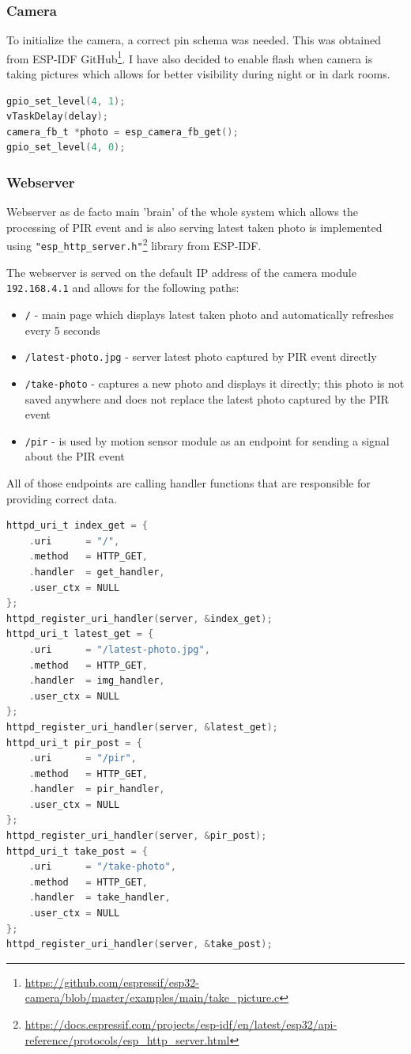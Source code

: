 \documentclass{article}
\begin{document}
    \subsubsection{Camera}
    To initialize the camera, a correct pin schema was needed. This was obtained from ESP-IDF GitHub\footnote{\url{https://github.com/espressif/esp32-camera/blob/master/examples/main/take_picture.c}}.
    I have also decided to enable flash when camera is taking pictures which allows for better visibility
    during night or in dark rooms.
    \begin{lstlisting}[language=C]
gpio_set_level(4, 1);
vTaskDelay(delay);
camera_fb_t *photo = esp_camera_fb_get();
gpio_set_level(4, 0);
    \end{lstlisting}
    
    \subsubsection{Webserver}
    Webserver as de facto main 'brain' of the whole system which allows the processing of PIR event and is also
    serving latest taken photo is implemented using \verb|"esp_http_server.h"|\footnote{\url{https://docs.espressif.com/projects/esp-idf/en/latest/esp32/api-reference/protocols/esp_http_server.html}} library from ESP-IDF.
    
    The webserver is served on the default IP address of the camera module \verb|192.168.4.1| and allows for the following paths:
    \begin{itemize}
        \item \verb|/| - main page which displays latest taken photo and automatically refreshes every 5 seconds
        \item \verb|/latest-photo.jpg| - server latest photo captured by PIR event directly
        \item \verb|/take-photo| - captures a new photo and displays it directly; this photo is not saved anywhere and does not replace
        the latest photo captured by the PIR event
        \item \verb|/pir| - is used by motion sensor module as an endpoint for sending a signal about the PIR event
    \end{itemize}
    
    All of those endpoints are calling handler functions that are responsible for providing correct data.
    \begin{lstlisting}[language=C]
httpd_uri_t index_get = {
    .uri      = "/",
    .method   = HTTP_GET,
    .handler  = get_handler,
    .user_ctx = NULL
};
httpd_register_uri_handler(server, &index_get);
httpd_uri_t latest_get = {
    .uri      = "/latest-photo.jpg",
    .method   = HTTP_GET,
    .handler  = img_handler,
    .user_ctx = NULL
};
httpd_register_uri_handler(server, &latest_get);
httpd_uri_t pir_post = {
    .uri      = "/pir",
    .method   = HTTP_GET,
    .handler  = pir_handler,
    .user_ctx = NULL
};
httpd_register_uri_handler(server, &pir_post);
httpd_uri_t take_post = {
    .uri      = "/take-photo",
    .method   = HTTP_GET,
    .handler  = take_handler,
    .user_ctx = NULL
};
httpd_register_uri_handler(server, &take_post);
    \end{lstlisting}
    
\end{document}
